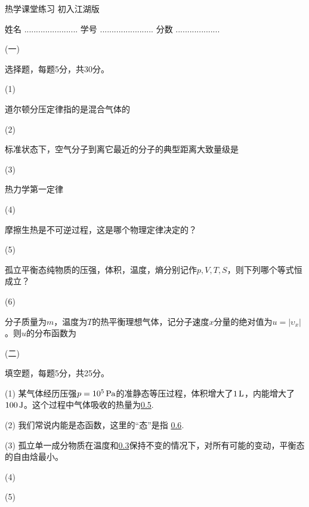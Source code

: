 \documentclass[10pt,CJK]{article}
\begin{document}
\bch
{\large 热学课堂练习 初入江湖版 }

{\vskip 0.05in}

姓名 ....................... {\hskip 0.5in}    学号 .......................{\hskip 0.5in}  分数 ...................


\bitem

\item[(一)]{选择题，每题5分，共30分。
\bitem
\item[(1)]{
  道尔顿分压定律指的是混合气体的 \bropt


}

\item[(2)]{标准状态下，空气分子到离它最近的分子的典型距离大致量级是 \bropt

  
}

  
\item[(3)]{热力学第一定律   \bropt

}

\item[(4)]{摩擦生热是不可逆过程，这是哪个物理定律决定的？   \bropt

}


\item[(5)]{孤立平衡态纯物质的压强，体积，温度，熵分别记作$p,V,T,S$，则下列哪个等式恒成立？ \bropt

}
  
  
  
\item[(6)]{分子质量为$m$，温度为$T$的热平衡理想气体，记分子速度$x$分量的绝对值为$u = |\upsilon_x|$。则$u$的分布函数为 \bropt
  

  
}
  



  \eitem
}


\item[(二)]{填空题，每题5分，共25分。

\bitem
\item[(1)]{某气体经历压强$p=10^5\,\mathrm{Pa}$的准静态等压过程，体积增大了$1\,\mathrm{L}$，内能增大了$100\,\mathrm{J}$。这个过程中气体吸收的热量为\uline{0.5}.}  
\item[(2)]{我们常说内能是态函数，这里的“态”是指 \uline{0.6}.}
\item[(3)]{孤立单一成分物质在温度和\uline{0.3}保持不变的情况下，对所有可能的变动，平衡态的自由焓最小。}
\item[(4)]{}
\item[(5)]{}    
\eitem
}
  
\end{document}
